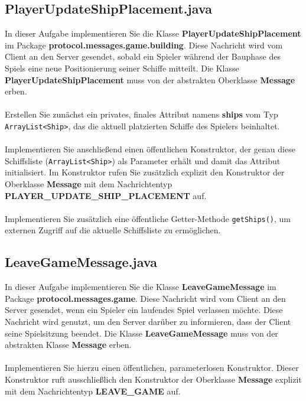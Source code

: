\documentclass[12pt]{article}
\begin{document}
\subsection*{PlayerUpdateShipPlacement.java}

In dieser Aufgabe implementieren Sie die Klasse \textbf{PlayerUpdateShipPlacement} im Package \textbf{protocol.messages.game.building}. Diese Nachricht wird vom Client an den Server gesendet, sobald ein Spieler während der Bauphase des Spiels eine neue Positionierung seiner Schiffe mitteilt. Die Klasse \textbf{PlayerUpdateShipPlacement} muss von der abstrakten Oberklasse \textbf{Message} erben.
\\ \\
Erstellen Sie zunächst ein privates, finales Attribut namens \textbf{ships} vom Typ \texttt{ArrayList<Ship>}, das die aktuell platzierten Schiffe des Spielers beinhaltet.
\\ \\
Implementieren Sie anschließend einen öffentlichen Konstruktor, der genau diese Schiffsliste (\texttt{ArrayList<Ship>}) als Parameter erhält und damit das Attribut initialisiert. Im Konstruktor rufen Sie zusätzlich explizit den Konstruktor der Oberklasse \textbf{Message} mit dem Nachrichtentyp \textbf{PLAYER\_UPDATE\_SHIP\_PLACEMENT} auf.
\\ \\
Implementieren Sie zusätzlich eine öffentliche Getter-Methode \texttt{getShips()}, um externen Zugriff auf die aktuelle Schiffsliste zu ermöglichen.

\subsection*{LeaveGameMessage.java}

In dieser Aufgabe implementieren Sie die Klasse \textbf{LeaveGameMessage} im Package \textbf{protocol.messages.game}. Diese Nachricht wird vom Client an den Server gesendet, wenn ein Spieler ein laufendes Spiel verlassen möchte. Diese Nachricht wird genutzt, um den Server darüber zu informieren, dass der Client seine Spielsitzung beendet. Die Klasse \textbf{LeaveGameMessage} muss von der abstrakten Klasse \textbf{Message} erben.
\\ \\
Implementieren Sie hierzu einen öffentlichen, parameterlosen Konstruktor. Dieser Konstruktor ruft ausschließlich den Konstruktor der Oberklasse \textbf{Message} explizit mit dem Nachrichtentyp \textbf{LEAVE\_GAME} auf.
\end{document}
